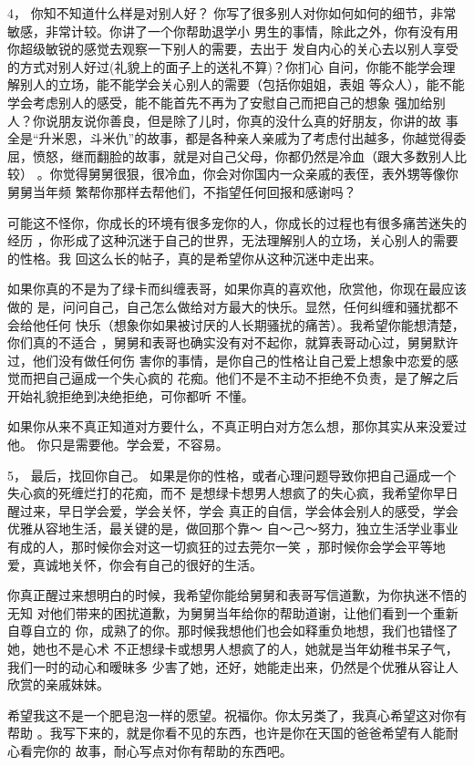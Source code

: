 \documentclass[12pt]{book}
\begin{document}
4，    你知不知道什么样是对别人好？
你写了很多别人对你如何如何的细节，非常敏感，非常计较。你讲了一个你帮助退学小
男生的事情，除此之外，你有没有用你超级敏锐的感觉去观察一下别人的需要，去出于
发自内心的关心去以别人享受的方式对别人好过(礼貌上的面子上的送礼不算)？你扪心
自问，你能不能学会理解别人的立场，能不能学会关心别人的需要（包括你姐姐，表姐
等众人），能不能学会考虑别人的感受，能不能首先不再为了安慰自己而把自己的想象
强加给别人？你说朋友说你善良，但是除了儿时，你真的没什么真的好朋友，你讲的故
事全是“升米恩，斗米仇”的故事，都是各种亲人亲戚为了考虑付出越多，你越觉得委
屈，愤怒，继而翻脸的故事，就是对自己父母，你都仍然是冷血（跟大多数别人比较）
。你觉得舅舅很狠，很冷血，你会对你国内一众亲戚的表侄，表外甥等像你舅舅当年频
繁帮你那样去帮他们，不指望任何回报和感谢吗？

可能这不怪你，你成长的环境有很多宠你的人，你成长的过程也有很多痛苦迷失的经历
，你形成了这种沉迷于自己的世界，无法理解别人的立场，关心别人的需要的性格。我
回这么长的帖子，真的是希望你从这种沉迷中走出来。

如果你真的不是为了绿卡而纠缠表哥，如果你真的喜欢他，欣赏他，你现在最应该做的
是，问问自己，自己怎么做给对方最大的快乐。显然，任何纠缠和骚扰都不会给他任何
快乐（想象你如果被讨厌的人长期骚扰的痛苦）。我希望你能想清楚，你们真的不适合
，舅舅和表哥也确实没有对不起你，就算表哥动心过，舅舅默许过，他们没有做任何伤
害你的事情，是你自己的性格让自己爱上想象中恋爱的感觉而把自己逼成一个失心疯的
花痴。他们不是不主动不拒绝不负责，是了解之后开始礼貌拒绝到决绝拒绝，可你都听
不懂。

如果你从来不真正知道对方要什么，不真正明白对方怎么想，那你其实从来没爱过他。
你只是需要他。学会爱，不容易。

5，    最后，找回你自己。
如果是你的性格，或者心理问题导致你把自己逼成一个失心疯的死缠烂打的花痴，而不
是想绿卡想男人想疯了的失心疯，我希望你早日醒过来，早日学会爱，学会关怀，学会
真正的自信，学会体会别人的感受，学会优雅从容地生活，最关键的是，做回那个靠～
自～己～努力，独立生活学业事业有成的人，那时候你会对这一切疯狂的过去莞尔一笑
，那时候你会学会平等地爱，真诚地关怀，你会有自己的很好的生活。

你真正醒过来想明白的时候，我希望你能给舅舅和表哥写信道歉，为你执迷不悟的无知
对他们带来的困扰道歉，为舅舅当年给你的帮助道谢，让他们看到一个重新自尊自立的
你，成熟了的你。那时候我想他们也会如释重负地想，我们也错怪了她，她也不是心术
不正想绿卡或想男人想疯了的人，她就是当年幼稚书呆子气，我们一时的动心和暧昧多
少害了她，还好，她能走出来，仍然是个优雅从容让人欣赏的亲戚妹妹。

希望我这不是一个肥皂泡一样的愿望。祝福你。你太另类了，我真心希望这对你有帮助
。我写下来的，就是你看不见的东西，也许是你在天国的爸爸希望有人能耐心看完你的
故事，耐心写点对你有帮助的东西吧。
\end{document}
